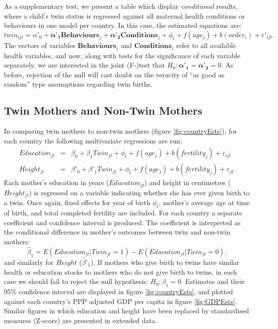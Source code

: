 \documentclass{nature}
\begin{document}
\begin{linenumbers}
As a supplementary test, we present a table which display \emph{conditional} results, where a child's twin status is regressed against all maternal health conditions or behaviours in one model per country.  In this case, the estimated equations are:
\begin{equation}
  \label{reg:twincond}
  twin_{ijt}=\alpha'_0 + \bm{\alpha'_1} \bm{Behaviours}_j + \bm{\alpha'_2} \bm{Conditions}_j + \phi_t + f(age_j) + b(order_i) + \varepsilon'_{ijt}.
\end{equation}
The vectors of variables $\bm{Behaviours}_j$ and $\bm{Conditions}_j$ refer to all available health variables, and now, along with tests for the significance of each variable separately, we are interested in the joint (F-)test that $H_0:\bm{\alpha'_1}=\bm{\alpha'_2}=0$.  As before, rejection of the null will cast doubt on the veracity of ``as good as random'' type assumptions regarding twin births.

\subsection{Twin Mothers and Non-Twin Mothers}
In comparing twin mothers to non-twin mothers (figure \ref{fig:countryEsts}), for each country the following multivariate regressions are run:
\begin{eqnarray}
  Education_{jt}&=&\beta_0 + \beta_1 Twin_{jt} + \phi_t + f(age_j) + b(fertility_j) + \varepsilon_{ijt} \\
  Height_{jt}&=&\beta'_0 + \beta'_1 Twin_{jt} + \phi_t + f(age_j) + b(fertility_j) + \varepsilon_{jt}.
\end{eqnarray}
Each mother's education in years ($Education_{jt}$) and height in centimetres ($Height_{jt}$) is regressed on a variable indicating whether she has ever given birth to a twin.  Once again, fixed effects for year of birth $\phi_t$, mother's average age at time of birth, and total completed fertility are included.  For each country a separate coefficient and confidence interval is produced.  The coefficient is interpreted as the conditional difference in mother's outcomes between twin and non-twin mothers:
\[
\hat\beta_1 = E(Education_{jt}| Twin_{jt}=1) - E(Education_{jt}| Twin_{jt}=0),
\]
and similarly for $Height$ ($\hat\beta'_1$).  If mothers who give birth to twins have similar health or education stocks to mothers who do not give birth to twins, in each case we should fail to reject the null hypothesis: $H_0: \beta_1=0$.  Estimates and their 95\% confidence interval are displayed in figure \ref{fig:countryEsts}, and plotted against each country's PPP adjusted GDP per capita in figure \ref{fig:GDPEsts}.  Similar figures in which education and height have been replaced by standardised measures (Z-score) are presented in extended data.


\end{linenumbers}
\end{document}

